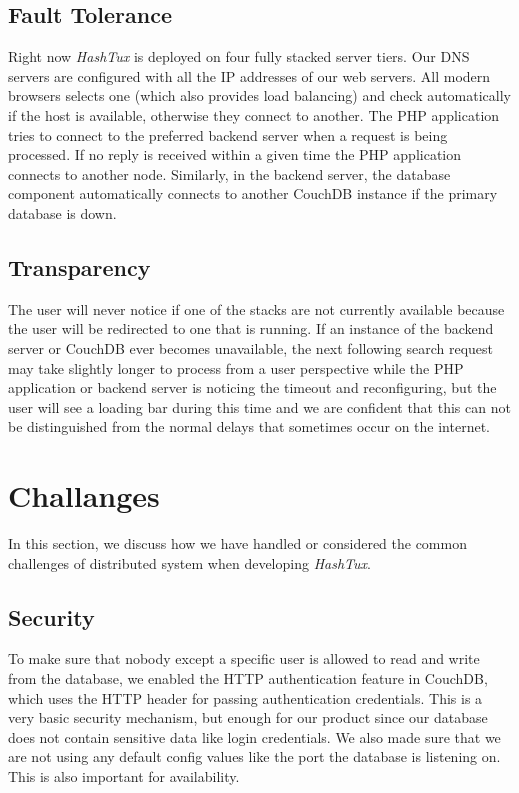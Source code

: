 \subsection{Fault Tolerance}
Right now \textit{HashTux} is deployed on four fully stacked server tiers. Our
DNS servers are configured with all the IP addresses of our web servers. All
modern browsers selects one (which also provides load balancing) and check
automatically if the host is available, otherwise they connect to another.
\newline
The PHP application tries to connect to the preferred backend server when a
request is being processed. If no reply is received within a given time the PHP
application connects to another node. \newline
Similarly, in the backend server, the database component automatically connects
to another CouchDB instance if the primary database is down.

\subsection{Transparency}
The user will never notice if one of the stacks are not currently available
because the user will be redirected to one that is running. If an instance of
the backend server or CouchDB ever becomes unavailable, the next following
search request may take slightly longer to process from a user perspective while
the PHP application or backend server is noticing the timeout and reconfiguring,
but the user will see a loading bar during this time and we are confident that
this can not be distinguished from the normal delays that sometimes occur on the
internet.

\section{Challanges}
In this section, we discuss how we have handled or considered the common
challenges of distributed system when developing \textit{HashTux}.

\subsection{Security}
To make sure that nobody except a specific user is allowed to read and write
from the database, we enabled the HTTP authentication feature in CouchDB, which
uses the HTTP header for passing authentication credentials. This is a very
basic security mechanism, but enough for our product since our database does not
contain sensitive data like login credentials. \newline
We also made sure that we are not using any default config values like the port
the database is listening on. This is also important for availability.

